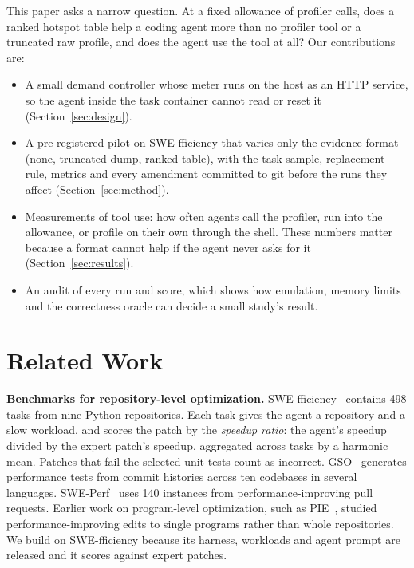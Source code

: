 \documentclass[conference]{IEEEtran}
\begin{document}
This paper asks a narrow question. At a fixed allowance of profiler calls,
does a ranked hotspot table help a coding agent more than no profiler tool or
a truncated raw profile, and does the agent use the tool at all? Our
contributions are:
\begin{itemize}
\item A small demand controller whose meter runs on the host as an HTTP
  service, so the agent inside the task container cannot read or reset it
  (Section~\ref{sec:design}).
\item A pre-registered pilot on SWE-fficiency that varies only the evidence
  format (none, truncated dump, ranked table), with the task sample,
  replacement rule, metrics and every amendment committed to git before the
  runs they affect (Section~\ref{sec:method}).
\item Measurements of tool use: how often agents call the profiler, run into
  the allowance, or profile on their own through the shell. These numbers
  matter because a format cannot help if the agent never asks for it
  (Section~\ref{sec:results}).
\item An audit of every run and score, which shows how emulation, memory
  limits and the correctness oracle can decide a small study's result.
\end{itemize}

\section{Related Work}

\textbf{Benchmarks for repository-level optimization.}
SWE-fficiency~\cite{ma2025swefficiency} contains 498 tasks from nine Python
repositories. Each task gives the agent a repository and a slow workload, and
scores the patch by the \emph{speedup ratio}: the agent's speedup divided by
the expert patch's speedup, aggregated across tasks by a harmonic mean. Patches
that fail the selected unit tests count as incorrect. GSO~\cite{shetty2025gso}
generates performance tests from commit histories across ten codebases in
several languages. SWE-Perf~\cite{he2025sweperf} uses 140 instances from
performance-improving pull requests. Earlier work on program-level
optimization, such as PIE~\cite{shypula2023pie}, studied performance-improving
edits to single programs rather than whole repositories. We build on
SWE-fficiency because its harness, workloads and agent prompt are released and
it scores against expert patches.
\end{document}
